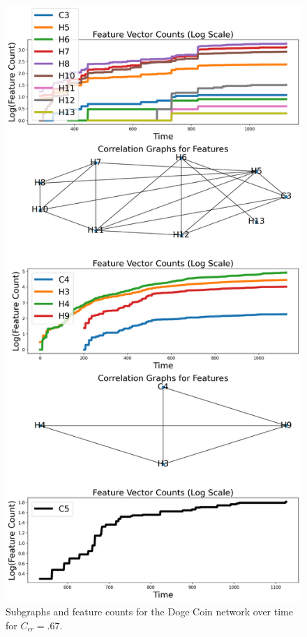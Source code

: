 \documentclass[a4paper,11pt]{article}
\begin{document}
\begin{figure}[h!]
    \includegraphics[width=.8\linewidth]{Images/DogeCoin/connected_components.png}
    \centering
    \caption{Subgraphs and feature counts for the Doge Coin network over time for $C_{cr}=.67$.}
\end{figure}
\clearpage
\pagebreak
\end{document}
